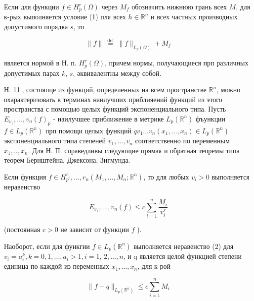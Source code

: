\documentclass[10pt]{article}
\begin{document}
Если для функции $f \in H_{p}^{r}(\Omega)$ через $M_{f}$ обозначить нижнюю грань всех $M$, для к-рых выполняется условие (1) пля всех $h \in \mathbb{R}^{n}$ и всех частных производных допустимого порядка $s$, то



\[

\|f\| \stackrel{\text { def }}{=}\|f\|_{L_{p}(\Omega)}+M_{f}

\]



является нормой в Н. п. $H_{p}^{r}(\Omega)$, причем нормы, получающиеся прп различных допустимых парах $k$, $s$, әквивалентны между собой.



Н. 11., состояпце из функций, определенных на всем пространстве $\mathbb{R}^{n}$, можно охарактеризовать в терминах наилучших приблияений функций из этого пространства с помощью целых функций экспоненциального типа. Пусть $E_{v_{1}}, \ldots, v_{n}(f)_{p}$ - наилучшее приближение в метрике $L_{p}\left(\mathbb{R}^{n}\right)$ фъункции $f \in L_{p}\left(\mathbb{R}^{n}\right)$ прп помощи целых функций $q v_{1} \ldots v_{n}\left(x_{1}, \ldots, x_{n}\right) \in L_{p}\left(\mathbb{R}^{n}\right)$ экспоненциального типа степеней $v_{1}, \ldots, v_{n}$ соответственно по переменным $x_{1}, . ., x_{n}$. Для Н. П. справедливы следующие прямая и обратная теоремы типа теорем Бернштейна, Джексона, Зигмунда.



Если функция $f \in H_{p}^{r_{1}}, \ldots, r_{n}\left(M_{1}, \ldots, M_{n} ; \mathbb{R}^{n}\right)$, то для любых $v_{i}>0$ выполняется неравенство



\[

E_{v_{1}}, \ldots, v_{n}(f) \leqslant c \sum_{i=1}^{n} \frac{M_{i}}{v_{i}^{r}}

\]



(постоянная $c>0$ не зависит от функции $f$ ).



Наоборот, если для функгии $f \in L_{p}\left(\mathbb{R}^{n}\right)$ выполняется неравенство (2) для $v_{i}=a_{i}^{k}, k=0,1, \ldots, a_{i}>1, i=1$, $2, \ldots, n$, и q является целой функцией степени единица по каждой из переменных $x_{1}, \ldots, x_{n}$, для к-рой



\[

\|f-q\|_{L_{p}\left(\mathbb{R}^{n}\right)} \leqslant c \sum_{i=1}^{n} M_{i}

\]
\end{document}
